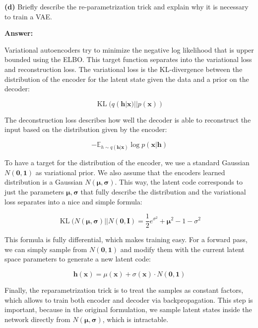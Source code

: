
\textbf{(d)} Briefly describe the re-parametrization trick and explain why it is necessary to train a VAE.

\textbf{Answer:}

Variational autoencoders try to minimize the negative log likelihood that is upper bounded using the ELBO. This target function separates into the variational loss and reconstruction loss. The variational loss is the KL-divergence between the distribution of the encoder for the latent state given the data and a prior on the decoder:

\begin{equation}
	\operatorname{KL}(q(\mathbf{h}|\mathbf{x}) || p(\mathbf{x}))
\end{equation}

The deconstruction loss describes how well the decoder is able to reconstruct the input based on the distribution given by the encoder:

\begin{equation}
	- \mathbb{E}_{h\sim q(\mathbf{h}|\mathbf{x})} \log p(\mathbf{x} | \mathbf{h})
\end{equation}

To have a target for the distribution of the encoder, we use a standard Gaussian $N(\mathbf{0}, \mathbf{1})$ as variational prior. We also assume that the encoders learned distribution is a Gaussian $N(\mathbf{\mu}, \mathbf{\sigma})$. This way, the latent code corresponds to just the parameters $\mathbf{\mu}, \mathbf{\sigma}$ that fully describe the distribution and the variational loss separates into a nice and simple formula:

\begin{equation}
	\operatorname{KL}(N(\mathbf{\mu}, \mathbf{\sigma})|| N(\mathbf{0}, \mathbf{I}) = \frac{1}{2} e^{\sigma^2} + \mathbf{\mu}^2 - 1 - \sigma^2
\end{equation}

This formula is fully differential, which makes training easy. For a forward pass, we can simply sample from $N(\mathbf{0}, \mathbf{1})$ and modify them with the current latent space parameters to generate a new latent code:

\begin{equation}
	\mathbf{h}(\mathbf{x}) = \mu(\mathbf{x}) + \sigma(\mathbf{x}) \cdot N(\mathbf{0}, \mathbf{1})
\end{equation}

Finally, the reparametrization trick is to treat the samples as constant factors, which allows to train both encoder and decoder via backpropagation. This step is important, because in the original formulation, we sample latent states inside the network directly from $N(\mathbf{\mu}, \mathbf{\sigma})$, which is intractable.

